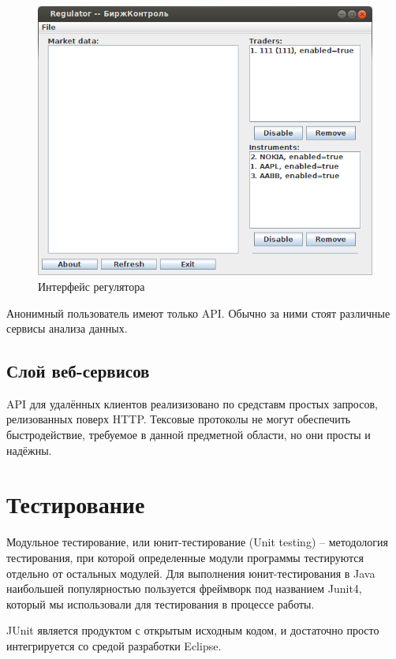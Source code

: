 \documentclass[a4paper, 12pt]{article}        %
\begin{document}
\begin{figure}[H]
\centering
\includegraphics[scale=0.8]{res/pic12}
\caption{Интерфейс регулятора}
\end{figure}

Анонимный пользователь имеют только API. Обычно за ними стоят различные сервисы анализа данных.

\subsection{Слой веб-сервисов}

API для удалённых клиентов реализизовано по средставм простых запросов, релизованных поверх HTTP. Тексовые протоколы не могут обеспечить быстродействие, требуемое в данной предметной области, но они просты и надёжны.

\newpage
\section{Тестирование}

Модульное тестирование, или юнит-тестирование (Unit testing) -- методология тестирования, при которой определенные модули программы тестируются отдельно от остальных модулей. Для выполнения юнит-тестирования в Java наибольшей популярностью пользуется фреймворк под названием Junit4, который мы использовали для тестирования в процессе работы.

JUnit является продуктом  с открытым исходным кодом, и достаточно просто интегрируется со средой разработки Eclipse.
\end{document}
